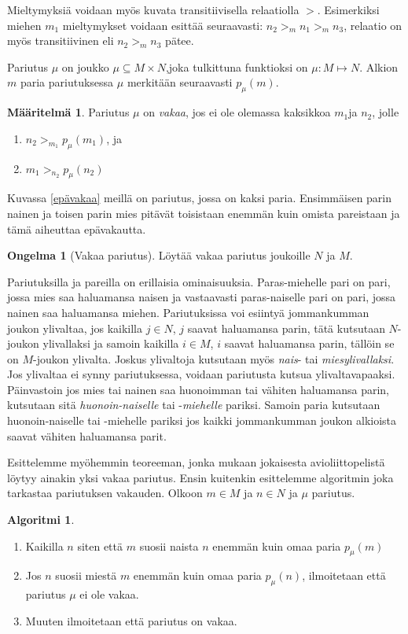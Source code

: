 \documentclass[finnish]{tktltiki2}
\theoremstyle{definition}
\newtheorem{maar}[lau]{Määritelmä}
\newtheorem{ong}{Ongelma}
\newtheorem{alg}[lau]{Algoritmi}
\theoremstyle{remark}
\begin{document}
Mieltymyksiä voidaan myös kuvata transitiivisella relaatiolla $>$. Esimerkiksi miehen $m_1$ mieltymykset voidaan esittää seuraavasti: $n_2 >_{m} n_1 >_{m} n_3$, relaatio on myös transitiivinen eli $n_2 >_{m} n_3$ pätee.

Pariutus $\mu$ on joukko $\mu \subseteq M \times N$,joka tulkittuna funktioksi on  $\mu : M \mapsto N$. Alkion $m$ paria pariutuksessa $\mu$ merkitään seuraavasti $p_{\mu}(m)$.

\begin{maar}
Pariutus $\mu$ on \emph{vakaa}, jos ei ole olemassa kaksikkoa $m_1$ja  $n_2$, jolle
\begin{enumerate}
	\item $n_2 >_{m_{1}} p_{\mu}(m_1)$, ja
	\item $m_1 >_{n_{2}} p_{\mu}(n_2)$
\end{enumerate}


Kuvassa \ref{epävakaa} meillä on pariutus, jossa on kaksi paria. Ensimmäisen parin nainen ja toisen parin mies pitävät toisistaan enemmän kuin omista pareistaan ja tämä aiheuttaa epävakautta.

\begin{ong}[Vakaa pariutus]
Löytää  vakaa pariutus joukoille $N$ ja $M$.
\end{ong}
\end{maar}

Pariutuksilla ja pareilla on erillaisia ominaisuuksia. Paras-miehelle pari on pari, jossa mies saa haluamansa naisen ja vastaavasti paras-naiselle pari on pari, jossa nainen saa haluamansa miehen. Pariutuksissa voi esiintyä jommankumman joukon ylivaltaa, jos kaikilla $j \in N$, $j$ saavat haluamansa parin, tätä kutsutaan $N$-joukon ylivallaksi ja samoin kaikilla $i \in M$, $i$ saavat haluamansa parin, tällöin se on $M$-joukon ylivalta. Joskus ylivaltoja kutsutaan myös \emph{nais}- tai \emph{miesylivallaksi}. Jos ylivaltaa ei synny pariutuksessa, voidaan pariutusta kutsua ylivaltavapaaksi.
Päinvastoin jos mies tai nainen saa huonoimman tai vähiten haluamansa parin, kutsutaan sitä \emph{huonoin-naiselle} tai -\emph{miehelle} pariksi. Samoin paria kutsutaan huonoin-naiselle tai -miehelle pariksi jos kaikki jommankumman joukon alkioista saavat vähiten haluamansa parit.

Esittelemme myöhemmin teoreeman, jonka mukaan jokaisesta avioliittopelistä löytyy ainakin yksi vakaa pariutus. Ensin kuitenkin esittelemme algoritmin joka tarkastaa pariutuksen vakauden.
Olkoon $m \in M$ ja $n \in N$ ja $\mu$ pariutus.
\begin{alg}
\begin{enumerate}
	\item Kaikilla $n$ siten että $m$ suosii naista $n$ enemmän kuin omaa paria $p_{\mu}(m)$
	\item Jos $n$ suosii miestä $m$ enemmän kuin omaa paria $p_{\mu}(n)$, ilmoitetaan että pariutus $\mu$ ei ole vakaa.
	\item Muuten ilmoitetaan että pariutus on vakaa.
\end{enumerate}
\end{alg}
\end{document}
